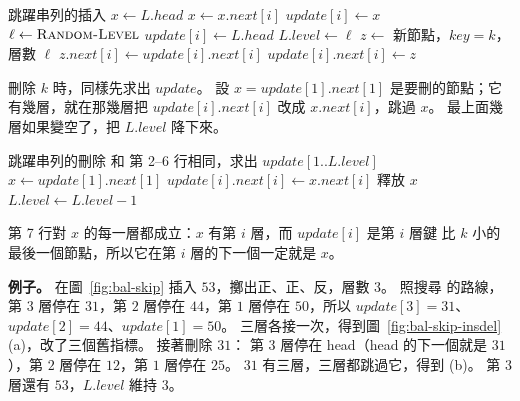 \begin{pseudo}[unbreakable, label=alg:bal-skip-insert]{跳躍串列的插入}
    \State $x \gets L.\mathit{head}$
            \State $x \gets x.\mathit{next}[i]$
        \EndWhile
        \State $\mathit{update}[i] \gets x$ 
    \EndFor
        \State \Return {}
    \EndIf
    \State $\ell \gets \Call{Random-Level}{}$
            \State $\mathit{update}[i] \gets L.\mathit{head}$
        \EndFor
        \State $L.\mathit{level} \gets \ell$
    \EndIf
    \State $z \gets$ 新節點，$\mathit{key} = k$，層數 $\ell$
        \State $z.\mathit{next}[i] \gets \mathit{update}[i].\mathit{next}[i]$
        \State $\mathit{update}[i].\mathit{next}[i] \gets z$
    \EndFor
\EndProcedure
\end{pseudo}

刪除 $k$ 時，同樣先求出 $\mathit{update}$。 設 $x = \mathit{update}[1].\mathit{next}[1]$
是要刪的節點；它有幾層，就在那幾層把 $\mathit{update}[i].\mathit{next}[i]$ 改成
$x.\mathit{next}[i]$，跳過 $x$。 最上面幾層如果變空了，把 $L.\mathit{level}$ 降下來。

\begin{pseudo}[unbreakable, label=alg:bal-skip-delete]{跳躍串列的刪除}
    \State 和  第 2--6 行相同，求出 $\mathit{update}[1..L.\mathit{level}]$
    \State $x \gets \mathit{update}[1].\mathit{next}[1]$
        \State \Return {}
    \EndIf
        \State $\mathit{update}[i].\mathit{next}[i] \gets x.\mathit{next}[i]$
    \EndFor
    \State 釋放 $x$
        \State $L.\mathit{level} \gets L.\mathit{level} - 1$
    \EndWhile
\EndProcedure
\end{pseudo}

第 7 行對 $x$ 的每一層都成立：$x$ 有第 $i$ 層，而 $\mathit{update}[i]$ 是第 $i$ 層鍵
比 $k$ 小的最後一個節點，所以它在第 $i$ 層的下一個一定就是 $x$。

\textbf{例子。} 在圖~\ref{fig:bal-skip} 插入 $53$，擲出正、正、反，層數 $3$。 照搜尋
的路線，第 $3$ 層停在 $31$，第 $2$ 層停在 $44$，第 $1$ 層停在 $50$，所以
$\mathit{update}[3] = 31$、$\mathit{update}[2] = 44$、$\mathit{update}[1] = 50$。
三層各接一次，得到圖~\ref{fig:bal-skip-insdel}(a)，改了三個舊指標。 接著刪除 $31$：
第 $3$ 層停在 head（head 的下一個就是 $31$），第 $2$ 層停在 $12$，第 $1$ 層停在
$25$。 $31$ 有三層，三層都跳過它，得到 (b)。 第 $3$ 層還有 $53$，$L.\mathit{level}$
維持 $3$。

